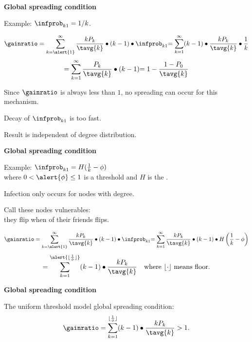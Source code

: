   \textbf{Global spreading condition}

  
   
    \alert{Example:} $\infprob_{k1}=1/k$.
   
    $$
    \gainratio
    =
    \sum_{k=\alert{1}}^{\infty}
    \frac{kP_k}{\tavg{k}}
    \bullet
    (k-1)
    \bullet
    \infprob_{k1}
    {
      =
      \sum_{k=1}^{\infty}
      (k-1)
      \bullet
      \frac{kP_k}{\tavg{k}}
      \bullet
      \frac{1}{k}
    }
    $$
    $$
    {
      =
      \sum_{k=1}^{\infty}
      \frac{P_k}{\tavg{k}}
      \bullet
      (k-1)
    }
    {
      =
      1 - \frac{1-P_0}{\tavg{k}}
    }
    $$
  
    Since $\gainratio$ is always less than $1$, no spreading
    can occur for this mechanism.
  
    Decay of $\infprob_{k1}$ is too fast.
  
    Result is independent of degree distribution.
  


  \textbf{Global spreading condition}

  
   
    \alert{Example:} $\infprob_{k1}=H(\frac{1}{k}-\phi)$\\
    where $0<\alert{\phi} \le 1$ is a \alert{threshold}
    and $H$ is the .
   
    Infection only occurs for nodes with  degree.
   
    Call these nodes \alert{vulnerables}:\\ 
    they flip
    when  of their friends flips.
   
    $$
    \gainratio
    =
    \sum_{k=\alert{1}}^{\infty}
    \frac{kP_k}{\tavg{k}}
    \bullet
    (k-1)
    \bullet
    \infprob_{k1}
    {
      =
      \sum_{k=1}^{\infty}
      \frac{kP_k}{\tavg{k}}
      \bullet
      (k-1)
      \bullet
      H\left(
        \frac{1}{k}-\phi
      \right)
    }
    $$
    $$
    {
      =
      \sum_{k=1}^{\alert{\lfloor \frac{1}{\phi} \rfloor}}
      (k-1)
      \bullet
      \frac{kP_k}{\tavg{k}}
    \mbox{\quad where $\lfloor \cdot \rfloor$ means floor.}
    }
    $$
  

  \textbf{Global spreading condition}

  
  
    The uniform threshold model global spreading condition:
    $$
    \gainratio
    =
    \sum_{k=1}^{{\lfloor \frac{1}{\phi} \rfloor}}
    (k-1)
    \bullet
    \frac{kP_k}
    {\tavg{k}} 
    > 1.
    $$
   
